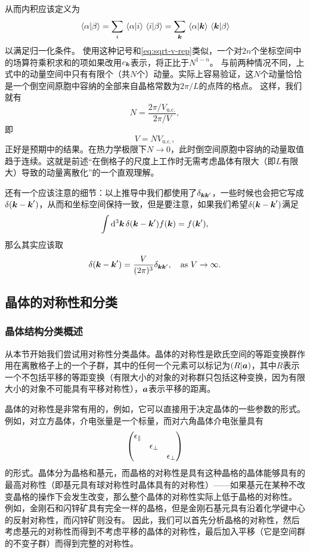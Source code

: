 \begin{enumerate}
    从而内积应该定义为
    \begin{equation}
        \braket*{\alpha}{\beta} = \sum_i \braket*{\alpha}{i} \braket*{i}{\beta} = \sum_{\vb*{k}} \braket*{\alpha}{\vb*{k}} \braket*{\vb*{k}}{\beta}
        \label{eq:sum-over-lattice}
    \end{equation}
    以满足归一化条件。
    使用这种记号和\eqref{eq:sqrt-v-rep}类似，一个对$2n$个坐标空间中的场算符乘积求和的项如果改用$c_{\vb*{k}}$表示，将正比于$N^{1-n}$。
    与前两种情况不同，上式中的动量空间中只有有限个（共$N$个）动量。实际上容易验证，这$N$个动量恰恰是一个倒空间原胞中容纳的全部来自晶格常数为$2\pi / L$的点阵的格点。
    这样，我们就有
    \[
        N = \frac{2\pi / V_\text{u.c.}}{2\pi / V},
    \]
    即
    \begin{equation}
        V = N V_\text{u.c.},
    \end{equation}
    正好是预期中的结果。在热力学极限下$N \to 0$，此时倒空间原胞中容纳的动量取值趋于连续。这就是前述“在倒格子的尺度上工作时无需考虑晶体有限大（即$L$有限大）导致的动量离散化”的一个直观理解。
\end{enumerate}

还有一个应该注意的细节：以上推导中我们都使用了$\delta_{\vb*{k} \vb*{k}'}$，一些时候也会把它写成$\delta(\vb*{k}- \vb*{k}')$，从而和坐标空间保持一致，但是要注意，如果我们希望$\delta(\vb*{k} - \vb*{k}')$满足
\[
    \int \dd[3]{\vb*{k}} \delta(\vb*{k} - \vb*{k}') f(\vb*{k}) = f(\vb*{k}'),
\]
那么其实应该取
\begin{equation}
    \delta(\vb*{k} - \vb*{k}') = \frac{V}{(2\pi)^3} \delta_{\vb*{k} \vb*{k}'} , \quad \text{as $V \to \infty$}.
\end{equation}

\subsection{晶体的对称性和分类}

\subsubsection{晶体结构分类概述}\label{sec:crystal-structure-intro}

从本节开始我们尝试用对称性分类晶体。晶体的对称性是欧氏空间的等距变换群作用在离散格子上的一个子群，其中的任何一个元素可以标记为$(R|\vb*{a})$，其中$R$表示一个不包括平移的等距变换（有限大小的对象的对称群只包括这种变换，因为有限大小的对象不可能具有平移对称性），$\vb*{a}$表示平移的距离。

晶体的对称性是非常有用的，例如，它可以直接用于决定晶体的一些参数的形式。例如，对立方晶体，介电张量是一个标量，而对六角晶体介电张量具有
\[
    \pmqty{\dmat{\epsilon_\parallel, \epsilon_\bot, \epsilon_\bot}}
\]
的形式。晶体分为晶格和基元，而晶格的对称性是具有这种晶格的晶体能够具有的最高对称性（即基元具有球对称性时晶体具有的对称性）——如果基元在某种不改变晶格的操作下会发生改变，那么整个晶体的对称性实际上低于晶格的对称性。
例如，金刚石和闪锌矿具有完全一样的晶格，但是金刚石基元具有沿着化学键中心的反射对称性，而闪锌矿则没有。 %
因此，我们可以首先分析晶格的对称性，然后考虑基元的对称性而得到不考虑平移的晶体的对称性，最后加入平移（它是空间群的不变子群）而得到完整的对称性。

